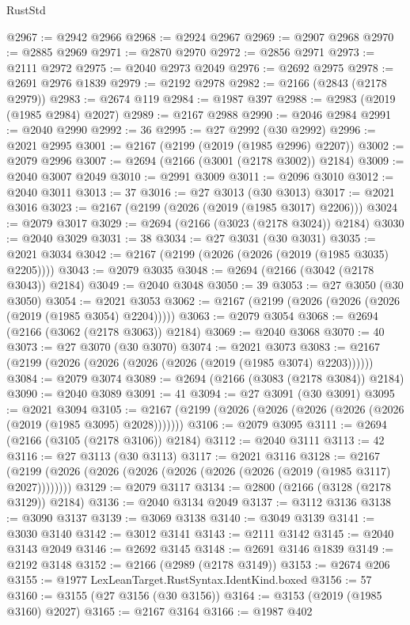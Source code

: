 \begin{lexlean}{RustStd}
\begin{coremodule}
@2967 := @2942 @2966
@2968 := @2924 @2967
@2969 := @2907 @2968
@2970 := @2885 @2969
@2971 := @2870 @2970
@2972 := @2856 @2971
@2973 := @2111 @2972
@2975 := @2040 @2973 @2049
@2976 := @2692 @2975
@2978 := @2691 @2976 @1839
@2979 := @2192 @2978
@2982 := @2166 (@2843 (@2178 @2979))
@2983 := @2674 @119
@2984 := @1987 @397
@2988 := @2983 (@2019 (@1985 @2984) @2027)
@2989 := @2167 @2988
@2990 := @2046 @2984
@2991 := @2040 @2990
@2992 := 36
@2995 := @27 @2992 (@30 @2992)
@2996 := @2021 @2995
@3001 := @2167 (@2199 (@2019 (@1985 @2996) @2207))
@3002 := @2079 @2996
@3007 := @2694 (@2166 (@3001 (@2178 @3002)) @2184)
@3009 := @2040 @3007 @2049
@3010 := @2991 @3009
@3011 := @2096 @3010
@3012 := @2040 @3011
@3013 := 37
@3016 := @27 @3013 (@30 @3013)
@3017 := @2021 @3016
@3023 := @2167 (@2199 (@2026 (@2019 (@1985 @3017) @2206)))
@3024 := @2079 @3017
@3029 := @2694 (@2166 (@3023 (@2178 @3024)) @2184)
@3030 := @2040 @3029
@3031 := 38
@3034 := @27 @3031 (@30 @3031)
@3035 := @2021 @3034
@3042 := @2167 (@2199 (@2026 (@2026 (@2019 (@1985 @3035) @2205))))
@3043 := @2079 @3035
@3048 := @2694 (@2166 (@3042 (@2178 @3043)) @2184)
@3049 := @2040 @3048
@3050 := 39
@3053 := @27 @3050 (@30 @3050)
@3054 := @2021 @3053
@3062 := @2167 (@2199 (@2026 (@2026 (@2026 (@2019 (@1985 @3054) @2204)))))
@3063 := @2079 @3054
@3068 := @2694 (@2166 (@3062 (@2178 @3063)) @2184)
@3069 := @2040 @3068
@3070 := 40
@3073 := @27 @3070 (@30 @3070)
@3074 := @2021 @3073
@3083 := @2167 (@2199 (@2026 (@2026 (@2026 (@2026 (@2019 (@1985 @3074) @2203))))))
@3084 := @2079 @3074
@3089 := @2694 (@2166 (@3083 (@2178 @3084)) @2184)
@3090 := @2040 @3089
@3091 := 41
@3094 := @27 @3091 (@30 @3091)
@3095 := @2021 @3094
@3105 := @2167 (@2199 (@2026 (@2026 (@2026 (@2026 (@2026 (@2019 (@1985 @3095) @2028)))))))
@3106 := @2079 @3095
@3111 := @2694 (@2166 (@3105 (@2178 @3106)) @2184)
@3112 := @2040 @3111
@3113 := 42
@3116 := @27 @3113 (@30 @3113)
@3117 := @2021 @3116
@3128 := @2167 (@2199 (@2026 (@2026 (@2026 (@2026 (@2026 (@2026 (@2019 (@1985 @3117) @2027))))))))
@3129 := @2079 @3117
@3134 := @2800 (@2166 (@3128 (@2178 @3129)) @2184)
@3136 := @2040 @3134 @2049
@3137 := @3112 @3136
@3138 := @3090 @3137
@3139 := @3069 @3138
@3140 := @3049 @3139
@3141 := @3030 @3140
@3142 := @3012 @3141
@3143 := @2111 @3142
@3145 := @2040 @3143 @2049
@3146 := @2692 @3145
@3148 := @2691 @3146 @1839
@3149 := @2192 @3148
@3152 := @2166 (@2989 (@2178 @3149))
@3153 := @2674 @206
@3155 := @1977 LexLeanTarget.RustSyntax.IdentKind.boxed
@3156 := 57
@3160 := @3155 (@27 @3156 (@30 @3156))
@3164 := @3153 (@2019 (@1985 @3160) @2027)
@3165 := @2167 @3164
@3166 := @1987 @402

\end{coremodule}
\end{lexlean}
